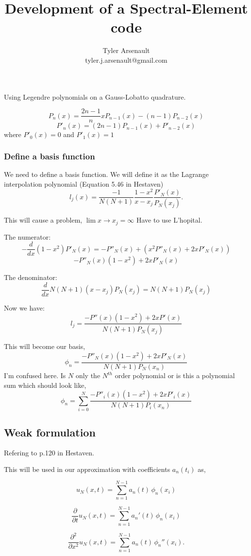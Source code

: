 \documentclass[12pt]{article}%
\title{Development of a Spectral-Element code}
\author{Tyler Arsenault\\ tyler.j.arsenault@gmail.com}
\date{}
\begin{document}
\maketitle

Using Legendre polynomials on a Gauss-Lobatto quadrature.

\[P_n(x)=\frac{2n-1}{n}xP_{n-1}(x)-(n-1)P_{n-2}(x)\]
%
\[P'_n(x)=(2n-1)P_{n-1}(x)+P'_{n-2}(x)\]
where $P'_0(x)=0$ and $P'_1(x)=1$


\subsubsection*{Define a basis function}
We need to define a basis function.  We will define it as the Lagrange interpolation polynomial (Equation 5.46 in Hestaven)
\[l_j(x)=\frac{-1}{N(N+1)}\frac{1-x^2}{x-x_j}\frac{P'_N(x)}{P_N(x_j)}
.\]

This will cause a problem, $\lim {x\to x_j}=\infty$
Have to use L'hopital.

The numerator:
\[-\frac{d}{dx} (1-x^2) P'_N(x)=-P''_N(x)+(x^2P''_N(x)+2xP'_N(x))\]
\[-P''_N(x)(1-x^2)+2xP'_N(x)\]

The denominator:
\[\frac{d}{dx}N(N+1)(x-x_j)P_N(x_j)=N(N+1)P_N(x_j)\]

Now we have:
\[l_j=\frac{-P''(x)(1-x^2)+2xP'(x)}{N(N+1)P_N(x_j)}\]

This will become our basis,
\[\phi_n=\frac{-P''_N(x)(1-x^2)+2xP'_N(x)}{N(N+1)P_N(x_n)}\]
I'm confused here. Is $N$ only the $N^{th}$ order polynomial or is this a polynomial sum which should look like,
\[\phi_n=\sum_{i=0}^N \frac{-P''_i(x)(1-x^2)+2xP'_i(x)}{N(N+1)P_i(x_n)}\]

\subsection*{Weak formulation}

Refering to p.120 in Hestaven.


This will be used in our approximation with coefficients $a_n(t_i)$ as,

\[u_N(x,t)=\sum_{n=1}^{N-1}a_n(t)\,\phi_n(x_i)\]

\[\frac{\partial}{\partial t} u_N(x,t)=\sum_{n=1}^{N-1}a_n'(t)\,\phi_n(x_i)\]

\[\frac{\partial ^2}{\partial x ^2} u_N(x,t)=\sum_{n=1}^{N-1}a_n(t)\,\phi_n''(x_i).\]
\end{document}
